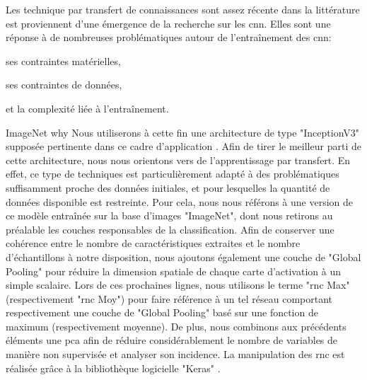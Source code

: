 Les technique par transfert de connaissances sont assez récente dans la littérature est proviennent d'une émergence de la recherche sur les \gls{cnn}. Elles sont une réponse à de nombreuses problématiques autour de l'entraînement des \gls{cnn}: 
\begin{inlinerate}
    \item ses contraintes matérielles,
    \item ses contraintes de données,
    \item et la complexité liée à l'entraînement.
\end{inlinerate}
ImageNet\cite{Deng2008} why\cite{huh2016}
Nous utiliserons à cette fin une architecture de type "InceptionV3" supposée pertinente dans ce cadre d'application \cite{Litjens2017}. Afin de tirer le meilleur parti de cette architecture, nous nous orientons vers de l'apprentissage par transfert. En effet, ce type de techniques est particulièrement adapté à des problématiques suffisamment proche des données initiales, et pour lesquelles la quantité de données disponible est restreinte. Pour cela, nous nous référons à une version de ce modèle entraînée sur la base d'images "ImageNet", dont nous retirons au préalable les couches responsables de la classification. Afin de conserver une cohérence entre le nombre de caractéristiques extraites et le nombre d'échantillons à notre disposition, nous ajoutons également une couche de "Global Pooling" pour réduire la dimension spatiale de chaque carte d'activation à un simple scalaire. Lors de ces prochaines lignes, nous utilisons le terme "\ac{rnc} Max" (respectivement "\ac{rnc} Moy") pour faire référence à un tel réseau comportant respectivement une couche de "Global Pooling" basé sur une fonction de maximum (respectivement moyenne). De plus, nous combinons aux précédents éléments une \ac{pca} afin de réduire considérablement le nombre de variables de manière non supervisée et analyser son incidence. La manipulation des \ac{rnc} est réalisée grâce à la bibliothèque logicielle "Keras" \cite{chollet2015keras}.\par

